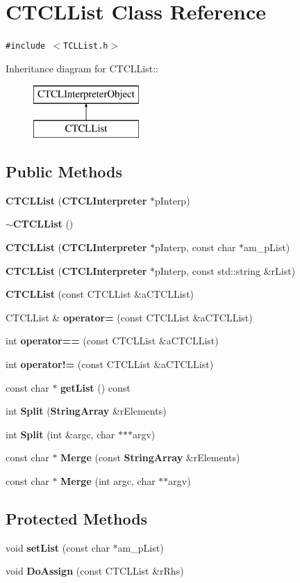 \section{CTCLList  Class Reference}
\label{classCTCLList}
{\tt \#include $<$TCLList.h$>$}

Inheritance diagram for CTCLList::\begin{figure}[H]
\begin{center}
\leavevmode
\includegraphics[height=2cm]{classCTCLList}
\end{center}
\end{figure}
\subsection*{Public Methods}
\begin{CompactItemize}
\item 
{\bf CTCLList} ({\bf CTCLInterpreter} $\ast$p\-Interp)
\item 
{\bf $\sim$CTCLList} ()
\item 
{\bf CTCLList} ({\bf CTCLInterpreter} $\ast$p\-Interp, const char $\ast$am\_\-p\-List)
\item 
{\bf CTCLList} ({\bf CTCLInterpreter} $\ast$p\-Interp, const std::string \&r\-List)
\item 
{\bf CTCLList} (const CTCLList \&a\-CTCLList)
\item 
CTCLList \& {\bf operator=} (const CTCLList \&a\-CTCLList)
\item 
int {\bf operator==} (const CTCLList \&a\-CTCLList)
\item 
int {\bf operator!=} (const CTCLList \&a\-CTCLList)
\item 
const char $\ast$ {\bf get\-List} () const
\item 
int {\bf Split} ({\bf String\-Array} \&r\-Elements)
\item 
int {\bf Split} (int \&argc, char $\ast$$\ast$$\ast$argv)
\item 
const char $\ast$ {\bf Merge} (const {\bf String\-Array} \&r\-Elements)
\item 
const char $\ast$ {\bf Merge} (int argc, char $\ast$$\ast$argv)
\end{CompactItemize}
\subsection*{Protected Methods}
\begin{CompactItemize}
\item 
void {\bf set\-List} (const char $\ast$am\_\-p\-List)
\item 
void {\bf Do\-Assign} (const CTCLList \&r\-Rhs)
\end{CompactItemize}
